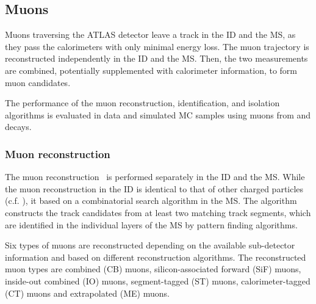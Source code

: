 \subsection{Muons}
\label{sec:methods:event-reconstruction:muons}
Muons traversing the ATLAS detector leave a track in the ID and the MS, as they pass the calorimeters with only minimal energy loss. The muon trajectory is reconstructed independently in the ID and the MS. Then, the two measurements are combined, potentially supplemented with calorimeter information, to form muon candidates.

The performance of the muon reconstruction, identification, and isolation algorithms is evaluated in data and simulated MC samples using muons from \HepProcess{\PZ \to \Pgmm \Pgmp} and \HepProcess{\PJgy \to \Pgmm \Pgmp} decays.

\subsubsection{Muon reconstruction}
The muon reconstruction~\cite{PERF-2015-10,ATLAS-CONF-2020-030} is performed separately in the ID and the MS. While the muon reconstruction in the ID is identical to that of other charged particles (c.f. ), it based on a combinatorial search algorithm in the MS. The algorithm constructs the track candidates from at least two matching track segments, which are identified in the individual layers of the MS by pattern finding algorithms.

Six types of muons are reconstructed depending on the available sub-detector information and based on different reconstruction algorithms. The reconstructed muon types are combined (CB) muons, silicon-associated forward (SiF) muons, inside-out combined (IO) muons, segment-tagged (ST) muons, calorimeter-tagged (CT) muons and extrapolated (ME) muons.

